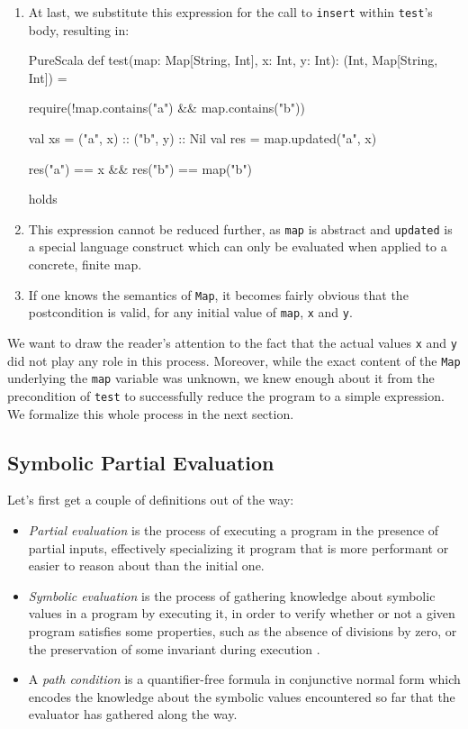\documentclass[a4paper,twoside]{article}
\newcommand{\stt}[1]{\texttt{\small{#1}}}
\begin{document}
\begin{enumerate}
\begin{ShortCode}{PureScala}
map.updated("a", x)
\end{ShortCode}

\item At last, we substitute this expression for the call to \stt{insert} within \stt{test}'s body, resulting in:

\begin{ShortCode}{PureScala}
def test(map: Map[String, Int], x: Int, y: Int): (Int, Map[String, Int]) = {
  require(!map.contains("a") && map.contains("b"))

  val xs  = ("a", x) :: ("b", y) :: Nil
  val res = map.updated("a", x)

  res("a") == x && res("b") == map("b")
} holds
\end{ShortCode}

\item This expression cannot be reduced further, as \stt{map} is abstract and \stt{updated} is a special language construct which can only be evaluated when applied to a concrete, finite map.

\item If one knows the semantics of \stt{Map}, it becomes fairly obvious that the postcondition is valid, for any initial value of \stt{map}, \stt{x} and \stt{y}.

\end{enumerate}

We want to draw the reader's attention to the fact that the actual values \stt{x} and \stt{y} did not play any role in this process. Moreover, while the exact content of the \stt{Map} underlying the \stt{map} variable was unknown, we knew enough about it from the precondition of \stt{test} to successfully reduce the program to a simple expression. We formalize this whole process in the next section.

\subsection{Symbolic Partial Evaluation}

Let's first get a couple of definitions out of the way:

\begin{itemize}
\item \textit{Partial evaluation} \cite{Jones:1993:PEA:153676} is the process of executing a program in the presence of partial inputs, effectively specializing it  program that is more performant or easier to reason about than the initial one.
\item \textit{Symbolic evaluation} \cite{King:1970:PV:905403} is the process of gathering knowledge about symbolic values in a program by executing it, in order to verify whether or not a given program satisfies some properties, such as the absence of divisions by zero, or the preservation of some invariant during execution \cite{DBLP:journals/corr/BaldoniCDDF16}.
\item A \textit{path condition} is a quantifier-free formula in conjunctive normal form which encodes the knowledge about the symbolic values encountered so far that the evaluator has gathered along the way.
\end{itemize}
\end{document}
